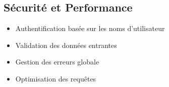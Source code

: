 \subsection{Sécurité et Performance}
\begin{itemize}
    \item Authentification basée sur les noms d'utilisateur
    \item Validation des données entrantes
    \item Gestion des erreurs globale
    \item Optimisation des requêtes
\end{itemize}
